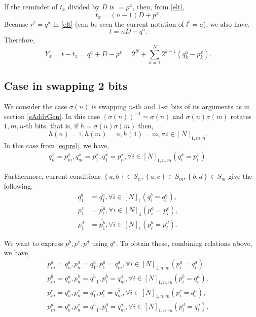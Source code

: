 \documentclass[a4paper]{article}
\newcommand{\eqlabel}[1]{\label{#1}}
\newcommand{\br}[1]{\left(#1\right)}
\newcommand{\cbr}[1]{\left\{#1\right\}}
\renewcommand{\bar}{\overline}
\begin{document}
If the reminder of \(t_x\) divided by \(D\) is \( = p^x\), then, from \eqref{elt}, 
\[
    t_x = (n-1) D + p^x.
\] 
Because \(r^t = q^a\) in \eqref{elt} (can be seen the current notation of \(l^t = a\)), we also have, 
\[
    t = n D + q^a.
\]
Therefore, 
\begin{equation}
    \eqlabel{etdiff}
Y_x = t - t_x  = q^a + D - p^x = 2^N + \sum_{k=1}^N 2^{k-1}\br{q^a_k - p^x_k}.
\end{equation}

\subsection{Case in swapping 2 bits}
We consider the case \(\sigma(n)\) is swapping \(n\)-th and \(1\)-st bits of its arguments as in section \ref{sAddrGen}. In this case \(\br{\sigma(n)}^{-1} = \sigma(n)\) and \(\sigma(n)\sigma(m)\) rotates \(1, m, n\)-th bits, that is, if \(h = \sigma(n)\sigma(m)\) then,
\[
    h(n) = 1, h(m) = n, h(1) = m, \forall i\in [N]_{1, m, n}.
\]
In this case from \eqref{eqprel}, we have, 
\begin{align*}
    q^x_n = p^x_m, q^x_m = p^x_1, q^x_1 = p^x_n, \forall i\in[N]_{1, n, m}\br{q^x_i = p^x_i}.
\end{align*} 

Furthermore, current conditions \(\cbr{a, b}\in S_n, \cbr{a, c}\in S_m, \cbr{b, d}\in S_m\) give the following,
\begin{align*}
    q^b_1 &= \bar{q^a_1}, \forall i\in [N]_1\br{q^b_i = q^a_i},\\
    p^c_1 &= \bar{p^a_1}, \forall i\in [N]_1\br{p^a_i = p^c_i},\\
    p^d_1 &= \bar{p^b_1}, \forall i\in [N]_1\br{p^b_i = p^d_i}.
\end{align*}


We want to express \(p^b, p^c, p^d\) using \(q^a\). To obtain these, combining relations above, we have,
\begin{align*}
    p^a_m = q^a_n, p^a_n = q^a_1, p^a_1 = q^a_m, \forall i\in[N]_{1, n, m}\br{p^a_i = q^a_i},\\
    p^b_m = q^a_n, p^b_n = \bar{q^a}_1, p^b_1 = q^a_m, \forall i\in[N]_{1, n, m}\br{p^b_i = q^a_i},\\
    p^c_m = q^a_n, p^c_n = q^a_1, p^c_1 = \bar{q^a_m}, \forall i\in[N]_{1, n, m}\br{p^c_i = q^a_i},\\
    p^d_m = q^a_n, p^c_n = \bar{q^a}_1, p^d_1 = \bar{q^a_m}, \forall i\in[N]_{1, n, m}\br{p^d_i = q^a_i}.
\end{align*} 
\end{document}
